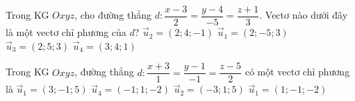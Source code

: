 \begin{ex}%
	Trong KG $Oxyz$, cho đường thẳng $d:\dfrac{x-3}{2}=\dfrac{y-4}{-5}=\dfrac{z+1}{3}$. Vectơ nào dưới đây là một vectơ chỉ phương của $d$?
	\choice
		{$\overrightarrow{u}_2=\left(2;4;-1\right)$}
		{\True $\overrightarrow{u}_1=\left(2;-5;3\right)$}
		{$\overrightarrow{u}_3=\left(2;5;3\right)$}
		{$\overrightarrow{u}_4=\left(3;4;1\right)$}
\end{ex}

\begin{ex}%
	Trong KG $Oxyz$, đường thẳng $d:\dfrac{x+3}{1}=\dfrac{y-1}{-1}=\dfrac{z-5}{2}$ có một vectơ chỉ phương là
	\choice
		{$\overrightarrow{u}_1=\left(3;-1; 5\right)$}
		{\True $\overrightarrow{u}_4=\left(-1; 1;-2\right)$}
		{$\overrightarrow{u}_2=\left(-3; 1; 5\right)$}
		{$\overrightarrow{u}_1=\left(1;-1;-2\right)$}
\end{ex}

